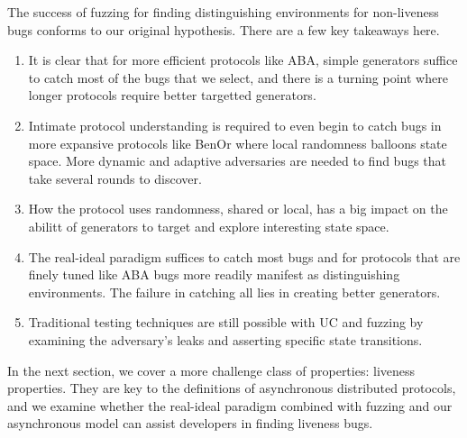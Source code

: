 The success of fuzzing for finding distinguishing environments for non-liveness bugs conforms to our original hypothesis.
There are a few key takeaways here.
\begin{enumerate}
\item It is clear that for more efficient protocols like ABA, simple generators suffice to catch most of the bugs that we select, and there is a turning point where longer protocols require better targetted generators.
\item Intimate protocol understanding is required to even begin to catch bugs in more expansive protocols like BenOr where local randomness balloons state space. More dynamic and adaptive adversaries are needed to find bugs that take several rounds to discover.
\item How the protocol uses randomness, shared or local, has a big impact on the abilitt of generators to target and explore interesting state space.
\item The real-ideal paradigm suffices to catch most bugs and for protocols that are finely tuned like ABA bugs more readily manifest as distinguishing environments. The failure in catching all lies in creating better generators. 
\item Traditional testing techniques are still possible with UC and fuzzing by examining the adversary's leaks and asserting specific state transitions.
\end{enumerate}

In the next section, we cover a more challenge class of properties: liveness properties.
They are key to the definitions of asynchronous distributed protocols, and we examine whether the real-ideal paradigm combined with fuzzing and our asynchronous model can assist developers in finding liveness bugs.

